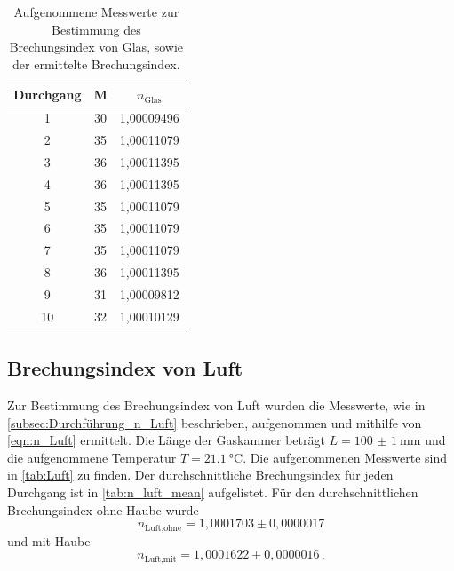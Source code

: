 \begin{table}[H]
  \centering
  \caption{Aufgenommene Messwerte zur Bestimmung des Brechungsindex von Glas, sowie der ermittelte Brechungsindex.}
  \label{tab:Glas}
  \begin{tabular}{c c c}
    \toprule
    Durchgang & M & $n_\text{Glas}$ \\
    \midrule
    1    &   30    &   1,00009496\\   
    2    &   35    &   1,00011079\\   
    3    &   36    &   1,00011395\\   
    4    &   36    &   1,00011395\\   
    5    &   35    &   1,00011079\\   
    6    &   35    &   1,00011079\\   
    7    &   35    &   1,00011079\\   
    8    &   36    &   1,00011395\\   
    9    &   31    &   1,00009812\\   
    10   &   32    &   1,00010129\\   
    \bottomrule
  \end{tabular}
\end{table}

\subsection{Brechungsindex von Luft}
\label{subsec:n_Luft}
Zur Bestimmung des Brechungsindex von Luft wurden die Messwerte, wie in \autoref{subsec:Durchführung_n_Luft} beschrieben, aufgenommen und mithilfe von \autoref{eqn:n_Luft} ermittelt.
Die Länge der Gaskammer beträgt $L = \SI[separate-uncertainty = true]{100(1)}{\milli\metre}$ \cite{anleitung} und die aufgenommene Temperatur $T = \SI{21.1}{\celsius}$.
Die aufgenommenen Messwerte sind in \autoref{tab:Luft} zu finden.
Der durchschnittliche Brechungsindex für jeden Durchgang ist in \autoref{tab:n_luft_mean} aufgelistet.
Für den durchschnittlichen Brechungsindex ohne Haube wurde
\begin{equation*}
  n_\text{Luft,ohne} = 1,0001703 \pm 0,0000017
\end{equation*}
und mit Haube 
\begin{equation*}
  n_\text{Luft,mit} =  1,0001622 \pm 0,0000016 \, .
\end{equation*}

